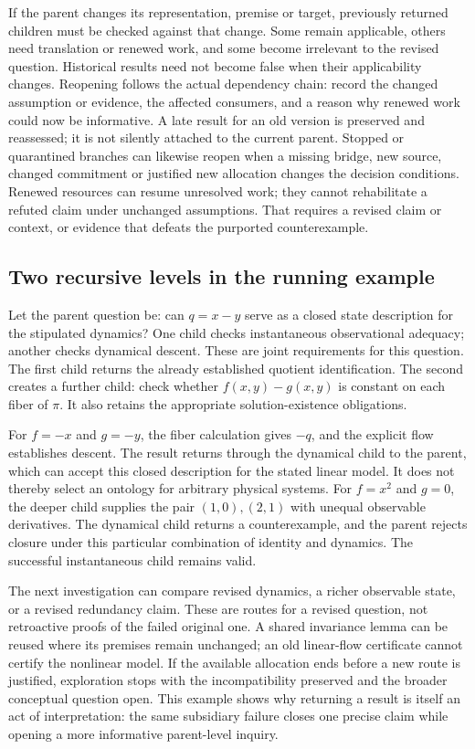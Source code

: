 If the parent changes its representation, premise or target, previously returned
children must be checked against that change. Some remain applicable, others
need translation or renewed work, and some become irrelevant to the revised
question. Historical results need not become false when their applicability
changes. Reopening follows the actual dependency chain: record the changed
assumption or evidence, the affected consumers, and a reason why renewed work
could now be informative. A late result for an old version is preserved and
reassessed; it is not silently attached to the current parent. Stopped or
quarantined branches can likewise reopen when a missing bridge, new source,
changed commitment or justified new allocation changes the decision conditions.
Renewed resources can resume unresolved work; they cannot rehabilitate a refuted
claim under unchanged assumptions. That requires a revised claim or context, or
evidence that defeats the purported counterexample.

\subsection{Two recursive levels in the running example}
Let the parent question be: can $q=x-y$ serve as a closed state description for
the stipulated dynamics? One child checks instantaneous observational adequacy;
another checks dynamical descent. These are joint requirements for this question.
The first child returns the already established quotient identification. The
second creates a further child: check whether $f(x,y)-g(x,y)$ is constant on each
fiber of $\pi$. It also retains the appropriate solution-existence obligations.

For $f=-x$ and $g=-y$, the fiber calculation gives $-q$, and the explicit flow
establishes descent. The result returns through the dynamical child to the
parent, which can accept this closed description for the stated linear model.
It does not thereby select an ontology for arbitrary physical systems.
For $f=x^2$ and $g=0$, the deeper child supplies the pair $(1,0),(2,1)$ with
unequal observable derivatives. The dynamical child returns a counterexample,
and the parent rejects closure under this particular combination of identity
and dynamics. The successful instantaneous child remains valid.

The next investigation can compare revised dynamics, a richer observable state,
or a revised redundancy claim. These are routes for a revised question, not
retroactive proofs of the failed original one. A shared invariance lemma can be
reused where its premises remain unchanged; an old linear-flow certificate
cannot certify the nonlinear model. If the available allocation ends before a
new route is justified, exploration stops with the incompatibility preserved
and the broader conceptual question open. This example shows why returning a
result is itself an act of interpretation: the same subsidiary failure closes
one precise claim while opening a more informative parent-level inquiry.

